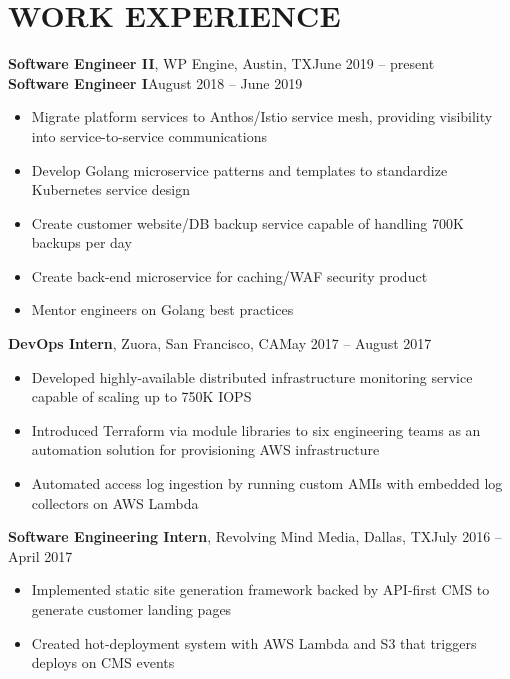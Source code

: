 \documentclass{resume}
\begin{document}
\maketitle

\section{WORK EXPERIENCE}

\textbf{Software Engineer II}, WP Engine, Austin, TX\hfill{June 2019 -- present}\\
\textbf{Software Engineer I}\hfill{August 2018 -- June 2019}
\begin{itemize}\itemsep0.3em
\item Migrate platform services to Anthos/Istio service mesh, providing visibility into service-to-service communications
\item Develop Golang microservice patterns and templates to standardize Kubernetes service design
\item Create customer website/DB backup service capable of handling 700K backups per day
\item Create back-end microservice for caching/WAF security product
\item Mentor engineers on Golang best practices
\end{itemize}\vspace{5pt}

\textbf{DevOps Intern}, Zuora, San Francisco, CA\hfill{May 2017 -- August 2017}
\begin{itemize}\itemsep0.3em
\item Developed highly-available distributed infrastructure monitoring service capable of scaling up to 750K IOPS
\item Introduced Terraform via module libraries to six engineering teams as an automation solution for provisioning AWS infrastructure
\item Automated access log ingestion by running custom AMIs with embedded log collectors on AWS Lambda
\end{itemize}\vspace{5pt}

\textbf{Software Engineering Intern}, Revolving Mind Media, Dallas, TX\hfill{July 2016 -- April 2017}
\begin{itemize}\itemsep0.3em
\item Implemented static site generation framework backed by API-first CMS to generate customer landing pages
\item Created hot-deployment system with AWS Lambda and S3 that triggers deploys on CMS events
\end{itemize}\vspace{5pt}
\end{document}
